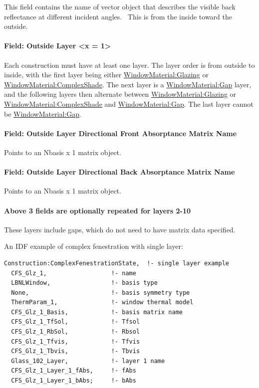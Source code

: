 This field contains the name of vector object that describes the visible back reflectance at different incident angles.~ This is from the inside toward the outside.

\paragraph{Field: Outside Layer \textless{}x = 1\textgreater{}}\label{field-outside-layer-x-1}

Each construction must have at least one layer. The layer order is from outside to inside, with the first layer being either \hyperref[windowmaterialglazing]{WindowMaterial:Glazing} or \hyperref[windowmaterialcomplexshade]{WindowMaterial:ComplexShade}. The next layer is a \hyperref[windowmaterialgap]{WindowMaterial:Gap} layer, and the following layers then alternate between \hyperref[windowmaterialglazing]{WindowMaterial:Glazing} or \hyperref[windowmaterialcomplexshade]{WindowMaterial:ComplexShade} and \hyperref[windowmaterialgap]{WindowMaterial:Gap}. The last layer cannot be \hyperref[windowmaterialgap]{WindowMaterial:Gap}.

\paragraph{Field: Outside Layer Directional Front Absorptance Matrix Name}\label{field-outside-layer-directional-front-absorptance-matrix-name}

Points to an Nbasis x 1 matrix object.

\paragraph{Field: Outside Layer Directional Back Absorptance Matrix Name}\label{field-outside-layer-directional-back-absorptance-matrix-name}

Points to an Nbasis x 1 matrix object.

\paragraph{Above 3 fields are optionally repeated for layers 2-10}\label{above-3-fields-are-optionally-repeated-for-layers-2-10}

These layers include gaps, which do not need to have matrix data specified.

An IDF example of complex fenestration with single layer:

\begin{lstlisting}
Construction:ComplexFenestrationState,  !- single layer example
  CFS_Glz_1,                  !- name
  LBNLWindow,                 !- basis type
  None,                       !- basis symmetry type
  ThermParam_1,               !- window thermal model
  CFS_Glz_1_Basis,            !- basis matrix name
  CFS_Glz_1_TfSol,            !- Tfsol
  CFS_Glz_1_RbSol,            !- Rbsol
  CFS_Glz_1_Tfvis,            !- Tfvis
  CFS_Glz_1_Tbvis,            !- Tbvis
  Glass_102_Layer,            !- layer 1 name
  CFS_Glz_1_Layer_1_fAbs,     !- fAbs
  CFS_Glz_1_Layer_1_bAbs;     !- bAbs
\end{lstlisting}


